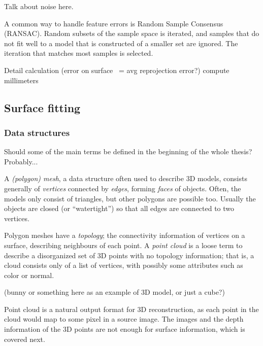 Talk about noise here.


A common way to handle feature errors is Random Sample Consensus (RANSAC). Random subsets of the sample space is iterated, and samples that do not fit well to a model that is constructed of a smaller set are ignored. The iteration that matches most samples is selected. \cite{hartley03multiview}


Detail calculation (error on surface ~= avg reprojection error?) compute millimeters



\subsection{Surface fitting} %

\subsubsection{Data structures} %

Should some of the main terms be defined in the beginning of the whole thesis? Probably...

A \textit{(polygon) mesh}, a data structure often used to describe 3D models, consists generally of \textit{vertices} connected by \textit{edges}, forming \textit{faces} of objects. Often, the models only consist of triangles, but other polygons are possible too.
Usually the objects are closed (or ``watertight'') so that all edges are connected to two vertices.

Polygon meshes have a \textit{topology}; the connectivity information of vertices on a surface, describing neighbours of each point.
A \textit{point cloud} is a loose term to describe a disorganized set of 3D points with no topology information; that is, a cloud consists only of a list of vertices, with possibly some attributes such as color or normal.

(bunny or something here as an example of 3D model, or just a cube?)


Point cloud is a natural output format for 3D reconstruction, as each point in the cloud would map to some pixel in a source image.
The images and the depth information of the 3D points are not enough for surface information, which is covered next.

